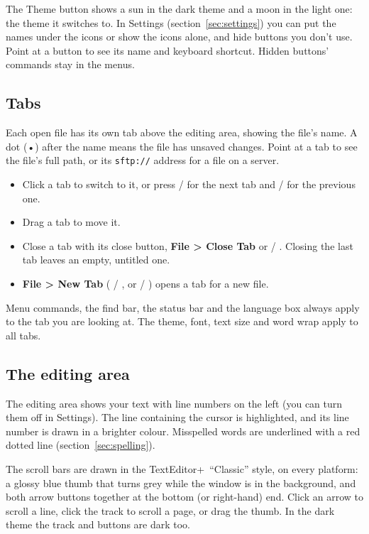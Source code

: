 \documentclass[11pt,a4paper]{article}
\newcommand{\appname}{TextEditor+}
\newcommand{\menu}[1]{\textsf{\textbf{#1}}}
\begin{document}
The Theme button shows a sun in the dark theme and a moon in the light one:
the theme it switches to. In Settings (section~\ref{sec:settings}) you can put
the names under the icons or show the icons alone, and hide buttons you don't
use. Point at a button to see its name and keyboard shortcut. Hidden buttons'
commands stay in the menus.

\subsection{Tabs}\label{sec:tabs}

Each open file has its own tab above the editing area, showing the file's
name. A dot (•) after the name means the file has unsaved changes. Point at a
tab to see the file's full path, or its \texttt{sftp://} address for a file on
a server.

\begin{itemize}
  \item Click a tab to switch to it, or press  / 
        for the next tab and  /  for the previous
        one.
  \item Drag a tab to move it.
  \item Close a tab with its close button, \menu{File > Close Tab} or
         / . Closing the last tab leaves an empty,
        untitled one.
  \item \menu{File > New Tab} ( / , or  /
        ) opens a tab for a new file.
\end{itemize}

Menu commands, the find bar, the status bar and the language box always apply
to the tab you are looking at. The theme, font, text size and word wrap apply
to all tabs.

\subsection{The editing area}

The editing area shows your text with line numbers on the left (you can turn
them off in Settings). The line containing the cursor is highlighted, and its
line number is drawn in a brighter colour. Misspelled words are underlined with
a red dotted line (section~\ref{sec:spelling}).

The scroll bars are drawn in the \appname\ ``Classic'' style, on every
platform: a glossy blue thumb that turns grey while the window is in the
background, and both arrow buttons together at the bottom (or right-hand) end.
Click an arrow to scroll a line, click the track to scroll a page, or drag the
thumb. In the dark theme the track and buttons are dark too.
\end{document}
